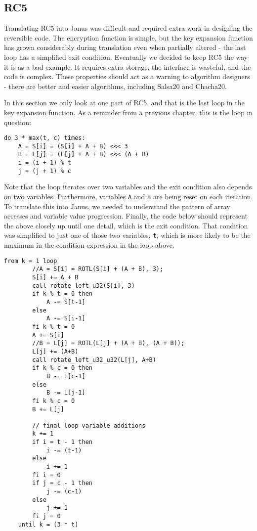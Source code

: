 \documentclass[a4paper,10pt,openright]{memoir}
\newcommand{\code}[1]{\texttt{#1}}
\begin{document}
\subsection{RC5}

Translating RC5 into Janus was difficult and required extra work in 
designing the reversible code. The encryption function is simple, but 
the key expansion function has grown considerably during translation 
even when partially altered - the last loop has a simplified exit 
condition. Eventually we decided to keep RC5 the way it is as a bad 
example. It requires extra storage, the interface is wasteful, and the 
code is complex. These properties should act as a warning to algorithm 
designers - there are better and easier algorithms, including Salsa20 
and Chacha20.

In this section we only look at one part of RC5, and that is the last 
loop in the key expansion function. As a reminder from a previous 
chapter, this is the loop in question:

\begin{verbatim}
do 3 * max(t, c) times:
    A = S[i] = (S[i] + A + B) <<< 3
    B = L[j] = (L[j] + A + B) <<< (A + B)
    i = (i + 1) % t
    j = (j + 1) % c
\end{verbatim}

Note that the loop iterates over two variables and the exit condition 
also depends on two variables. Furthermore, variables \code{A} and 
\code{B} are being reset on each iteration. To translate this into 
Janus, we needed to understand the pattern of array accesses and 
variable value progression. Finally, the code below should represent 
the above closely up until one detail, which is the exit condition. 
That condition was simplified to just one of those two variables, 
\code{t}, which is more likely to be the maximum in the condition 
expression in the loop above.

\begin{lstlisting}[language=Janus,breaklines=true]
	from k = 1 loop
        //A = S[i] = ROTL(S[i] + (A + B), 3);
        S[i] += A + B
        call rotate_left_u32(S[i], 3)
        if k % t = 0 then
            A -= S[t-1]
        else 
            A -= S[i-1]
        fi k % t = 0
        A += S[i]
        //B = L[j] = ROTL(L[j] + (A + B), (A + B));
        L[j] += (A+B)
        call rotate_left_u32_u32(L[j], A+B)
        if k % c = 0 then
            B -= L[c-1]
        else 
            B -= L[j-1]
        fi k % c = 0
        B += L[j]
        
        // final loop variable additions
        k += 1
        if i = t - 1 then
            i -= (t-1)
        else
            i += 1
        fi i = 0
        if j = c - 1 then
            j -= (c-1)
        else
            j += 1
        fi j = 0
    until k = (3 * t)
\end{lstlisting}
\end{document}
